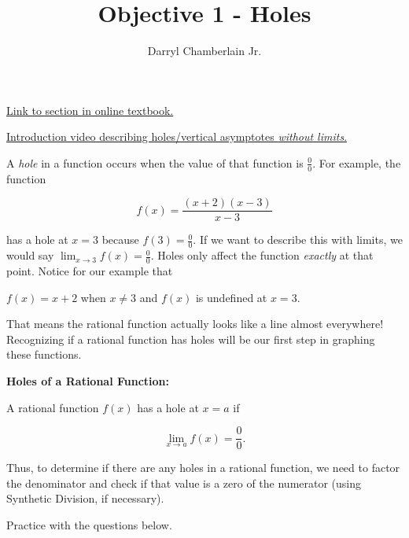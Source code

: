 \documentclass{ximera}
\author{Darryl Chamberlain Jr.}
\title{Objective 1 - Holes}
\begin{document}
\begin{abstract}

\end{abstract}
\maketitle
 
\href{https://cnx.org/contents/mwjClAV_@8.21:KNTP2r7D@14/Rational-Functions}{Link to section in online textbook.}

\href{https://mediasite.video.ufl.edu/Mediasite/Play/7c895945aa40406e93f9a39e2aa343561d}{Introduction video describing holes/vertical asymptotes \textit{without limits}.}
 

A \textit{hole} in a function occurs when the value of that function is $\frac{0}{0}$. For example, the function 

$$f(x) = \frac{(x+2)(x-3)}{x-3}$$

has a hole at $x=3$ because $f(3) = \frac{0}{0}$. If we want to describe this with limits, we would say $\lim_{x \rightarrow 3} f(x) = \frac{0}{0}$. Holes only affect the function \textit{exactly} at that point. Notice for our example that

\begin{center} $f(x) = x+2$ when $x \neq 3$ and $f(x)$ is undefined at $x=3$. \end{center}

That means the rational function actually looks like a line almost everywhere! Recognizing if a rational function has holes will be our first step in graphing these functions. 

\begin{theorem}
\textbf{Holes of a Rational Function: }

A rational function $f(x)$ has a hole at $x=a$ if 

$$\lim_{x \rightarrow a} f(x) = \frac{0}{0}.$$ 

Thus, to determine if there are any holes in a rational function, we need to factor the denominator and check if that value is a zero of the numerator (using Synthetic Division, if necessary). 
\end{theorem}

Practice with the questions below. 
\end{document}
